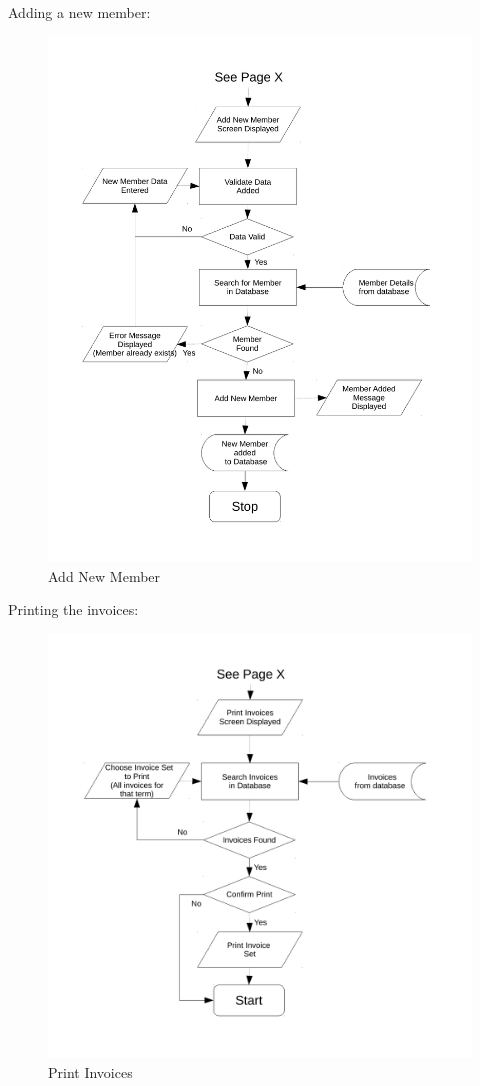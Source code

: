 Adding a new member:
\begin{figure}[H]
\includegraphics[width=\textwidth]{./Design/images/FC_add_new_member.pdf}
    \caption{Add New Member} \label{fig:Flow Chart Add New Member}
\end{figure}

Printing the invoices:
\begin{figure}[H]
\includegraphics[width=\textwidth]{./Design/images/FC_print_invoices.pdf}
    \caption{Print Invoices} \label{fig:Flow Chart Print Invoices}
\end{figure}

